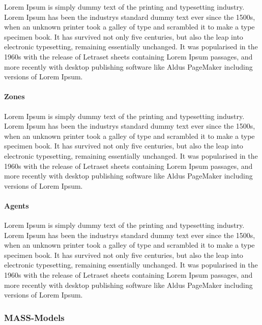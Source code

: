  Lorem Ipsum is simply dummy text of the printing and typesetting industry. Lorem Ipsum has been the industry\textquotesingle{}s standard dummy text ever since the 1500s, when an unknown printer took a galley of type and scrambled it to make a type specimen book. It has survived not only five centuries, but also the leap into electronic typesetting, remaining essentially unchanged. It was popularised in the 1960s with the release of Letraset sheets containing Lorem Ipsum passages, and more recently with desktop publishing software like Aldus Page\+Maker including versions of Lorem Ipsum.

 

\paragraph*{Zones}

 Lorem Ipsum is simply dummy text of the printing and typesetting industry. Lorem Ipsum has been the industry\textquotesingle{}s standard dummy text ever since the 1500s, when an unknown printer took a galley of type and scrambled it to make a type specimen book. It has survived not only five centuries, but also the leap into electronic typesetting, remaining essentially unchanged. It was popularised in the 1960s with the release of Letraset sheets containing Lorem Ipsum passages, and more recently with desktop publishing software like Aldus Page\+Maker including versions of Lorem Ipsum.

 

\paragraph*{Agents}

 Lorem Ipsum is simply dummy text of the printing and typesetting industry. Lorem Ipsum has been the industry\textquotesingle{}s standard dummy text ever since the 1500s, when an unknown printer took a galley of type and scrambled it to make a type specimen book. It has survived not only five centuries, but also the leap into electronic typesetting, remaining essentially unchanged. It was popularised in the 1960s with the release of Letraset sheets containing Lorem Ipsum passages, and more recently with desktop publishing software like Aldus Page\+Maker including versions of Lorem Ipsum.

 

\subsubsection*{M\+A\+S\+S-\/\+Models}

